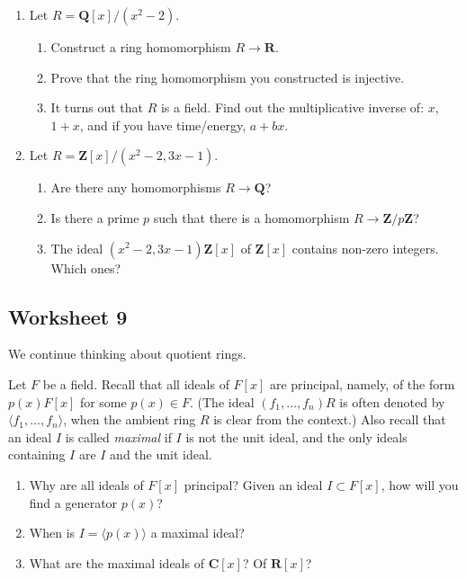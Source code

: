 \documentclass[11pt]{article}
\begin{document}
\begin{enumerate}
\item Let \(R = \mathbf{Q}[x]/(x^2-2)\).
\begin{enumerate}
\item Construct a ring homomorphism \(R \to \mathbf{R}\).
\item Prove that the ring homomorphism you constructed is injective.
\item It turns out that \(R\) is a field.  Find out the multiplicative inverse of: \(x\), \(1+x\), and if you have time/energy, \(a+bx\).
\end{enumerate}

\item Let \(R = \mathbf{Z}[x]/(x^2-2, 3x-1)\).
\begin{enumerate}
\item Are there any homomorphisms \(R \to \mathbf{Q}\)?
\item Is there a prime \(p\) such that there is a homomorphism \(R \to \mathbf{Z}/p \mathbf{Z}\)?
\item The ideal \((x^2-2, 3x-1) \mathbf{Z}[x]\) of \(\mathbf{Z}[x]\) contains non-zero integers.  Which ones?
\end{enumerate}
\end{enumerate}


\subsection{Worksheet 9}
\label{sec:org09591a1}
We continue thinking about quotient rings.  

Let \(F\) be a field.
Recall that all ideals of \(F[x]\) are principal, namely, of the form \(p(x)F[x]\)  for some \(p(x) \in F\).
(The ideal \((f_1,\dots, f_n)R\) is often denoted by \(\langle f_1,\dots,f_n \rangle\), when the ambient ring \(R\) is clear from the context.)
Also recall that an ideal \(I\) is called \emph{maximal} if \(I\) is not the unit ideal, and the only ideals containing \(I\) are \(I\) and the unit ideal.

\begin{enumerate}
\item Why are all ideals of \(F[x]\) principal?  Given an ideal \(I \subset F[x]\), how will you find a generator \(p(x)\)?
\item When is \(I = \langle p(x) \rangle\) a maximal ideal?
\item What are the maximal ideals of \(\mathbf{C}[x]\)?  Of \(\mathbf{R}[x]\)?
\end{enumerate}
\end{document}
